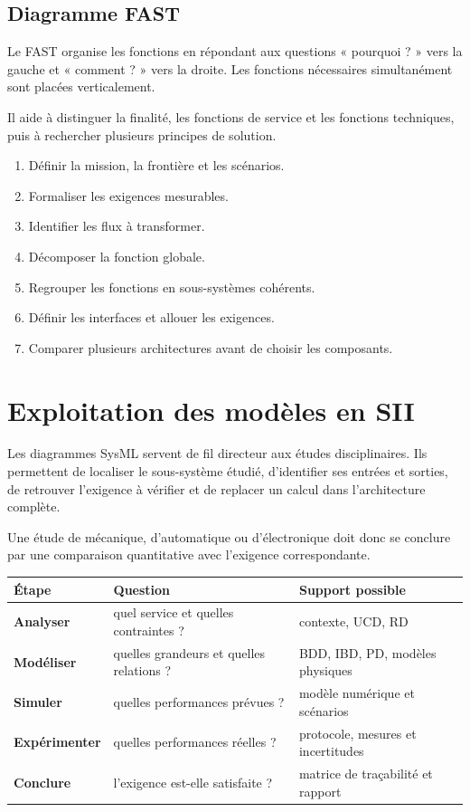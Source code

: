 \subsection{Diagramme FAST}

Le FAST organise les fonctions en répondant aux questions « pourquoi ? » vers la gauche et « comment ? » vers la droite. Les fonctions nécessaires simultanément sont placées verticalement.

Il aide à distinguer la finalité, les fonctions de service et les fonctions techniques, puis à rechercher plusieurs principes de solution.

\begin{ISmethode}[title={Passer du besoin à l'architecture}]
\begin{enumerate}
  \item Définir la mission, la frontière et les scénarios.
  \item Formaliser les exigences mesurables.
  \item Identifier les flux à transformer.
  \item Décomposer la fonction globale.
  \item Regrouper les fonctions en sous-systèmes cohérents.
  \item Définir les interfaces et allouer les exigences.
  \item Comparer plusieurs architectures avant de choisir les composants.
\end{enumerate}
\end{ISmethode}

\section{Exploitation des modèles en SII}\label{sec:is-exploitation}

Les diagrammes SysML servent de fil directeur aux études disciplinaires. Ils permettent de localiser le sous-système étudié, d'identifier ses entrées et sorties, de retrouver l'exigence à vérifier et de replacer un calcul dans l'architecture complète.

Une étude de mécanique, d'automatique ou d'électronique doit donc se conclure par une comparaison quantitative avec l'exigence correspondante.

\begin{center}
\begin{tabularx}{\linewidth}{>{\bfseries}p{.23\linewidth}X X}
\toprule
Étape & Question & Support possible \\
\midrule
Analyser & quel service et quelles contraintes ? & contexte, UCD, RD \\
Modéliser & quelles grandeurs et quelles relations ? & BDD, IBD, PD, modèles physiques \\
Simuler & quelles performances prévues ? & modèle numérique et scénarios \\
Expérimenter & quelles performances réelles ? & protocole, mesures et incertitudes \\
Conclure & l'exigence est-elle satisfaite ? & matrice de traçabilité et rapport \\
\bottomrule
\end{tabularx}
\end{center}

